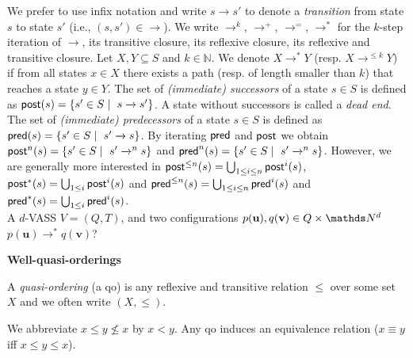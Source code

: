 We prefer to use infix notation and write $s \rightarrow s'$ to denote a {\em transition} from state $s$ to state $s'$ (i.e., $ (s,s') \in  {\rightarrow} $).
We write $\rightarrow^{k}$, $\rightarrow^{+}$, $\rightarrow^{=}$, $\rightarrow^{*}$
for the $k$-step iteration of $\rightarrow$, its transitive closure, its reflexive closure, its reflexive and transitive closure.
Let $X,Y \subseteq S$ and $k \in \mathbb{N}$. We denote $X \longrightarrow^{*} Y$ (resp. $X \longrightarrow^{\leq k} Y$) if from all states $x \in X$ there exists a path (resp. of length smaller than $k$) that reaches a state $y \in Y$.
\noindent
The set of {\em (immediate) successors} of a state $s \in S$ is defined as 
 $\textsf{post}(s) = \{ s' \in S \mid  ~ s \xrightarrow{} s'\}$. 
A state without successors is called a {\em dead end}. 
The set of {\em (immediate) predecessors} of a state $s \in S$ is deﬁned as
 $\textsf{pred}(s) = \{ s' \in S \mid  ~ s' \xrightarrow{} s\}$. 
By iterating $\textsf{pred}$ and $\textsf{post}$ we obtain  
$\textsf{post}^n(s) = \{ s' \in S \mid  ~ s' \xrightarrow{}^n s\}$
and
$\textsf{pred}^n(s) = \{ s' \in S \mid  ~ s' \xrightarrow{}^n s\}$.
However, we are generally more interested in
$\textsf{post}^{\leq n}(s) = \bigcup_{1 \leq i \leq n} \textsf{post}^i(s)$, $\textsf{post}^*(s)= \bigcup_{1 \leq i} \textsf{post}^i(s)$
and
$\textsf{pred}^{\leq n}(s) = \bigcup_{1 \leq i \leq n} \textsf{pred}^i(s)$ and $\textsf{pred}^*(s) = \bigcup_{1 \leq i} \textsf{pred}^i(s)$. \\


{A $d$-VASS $V=(Q,T)$, and two configurations $p(\textbf{u}), q(\textbf{v}) \in Q \times \N^d$}
{$p(\textbf{u}) \to^* q(\textbf{v})$? \\}


%

\noindent
{\bf Well-quasi-orderings}

A {\em quasi-ordering} (a qo) is any reflexive and transitive relation $\leq$ over some set $X$ and we often write $(X,\leq)$.

We abbreviate $x \leq y \not\leq x$ by $x < y$.
Any qo induces an equivalence relation ($x \equiv y$ iff $x \leq y \leq x$).

